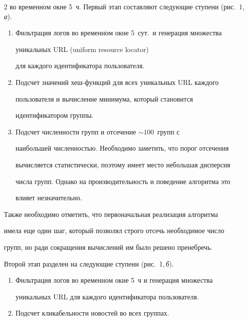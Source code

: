 \begin{multicols}{2}
во временн$\acute{\mbox{о}}$м окне 5~ч. Первый этап составляют следующие ступени (рис.~1,\,\textit{а}).


   \begin{enumerate}[1.]


\item Фильтрация логов во временн$\acute{\mbox{о}}$м окне 5~сут.\ и генерация множества 


уникальных URL (uniform resource locator)


для каж\-до\-го идентификатора пользователя.


\item Подсчет значений хеш-функ\-ций для всех уникальных URL каждого 


пользователя и вычисление минимума, который становится 


идентификатором группы.


\item Подсчет численности групп и отсечение \mbox{$\sim100$}~групп с 


наибольшей численностью. Необходимо заметить, что порог отсечения 


вычисляется статистически, поэтому имеет место небольшая дисперсия 


числа групп. Однако на производительность и поведение алгоритма это 


влияет незначительно.


\end{enumerate}








   Также необходимо отметить, что первоначальная реализация алгоритма 


имела еще один шаг, который позволял строго отсечь необходимое число 


групп, но ради сокращения вычислений им было решено пренебречь.


   


   Второй этап разделен на следующие ступени (рис.~1,\,\textit{б}).


   \begin{enumerate}[1.]


\item Фильтрация логов во временн$\acute{\mbox{о}}$м окне 5~ч и генерация множества 


уникальных URL для каж\-до\-го идентификатора пользователя.


\item Подсчет кликабельности новостей во всех группах.



\end{enumerate}
\end{multicols}
